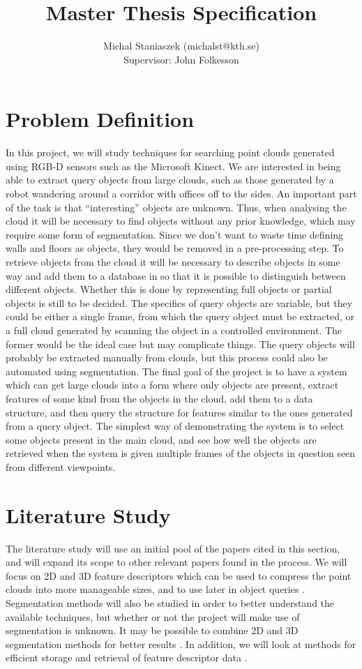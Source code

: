 \documentclass[10pt,a4paper]{article}
\author{Michal Staniaszek (michalst@kth.se)\\ Supervisor: John Folkesson}
\title{Master Thesis Specification}
\begin{document}
\maketitle
\section{Problem Definition}
In this project, we will study techniques for searching point clouds generated
using RGB-D sensors such as the Microsoft Kinect. We are interested in being
able to extract query objects from large clouds, such as those generated by a
robot wandering around a corridor with offices off to the sides. An important
part of the task is that ``interesting'' objects are unknown. Thus, when
analysing the cloud it will be necessary to find objects without any prior
knowledge, which may require some form of segmentation. Since we don't want to
waste time defining walls and floors as objects, they would be removed in a
pre-processing step. To retrieve objects from the cloud it will be necessary to
describe objects in some way and add them to a database in so that it is
possible to distinguish between different objects. Whether this is done by
representing full objects or partial objects is still to be decided. The
specifics of query objects are variable, but they could be either a single
frame, from which the query object must be extracted, or a full cloud generated
by scanning the object in a controlled environment. The former would be the
ideal case but may complicate things. The query objects will probably be
extracted manually from clouds, but this process could also be automated using
segmentation. The final goal of the project is to have a system which can get
large clouds into a form where only objects are present, extract features of
some kind from the objects in the cloud, add them to a data structure, and then
query the structure for features similar to the ones generated from a query
object. The simplest way of demonstrating the system is to select some objects
present in the main cloud, and see how well the objects are retrieved when the
system is given multiple frames of the objects in question seen from different
viewpoints.
\section{Literature Study}
The literature study will use an initial pool of the papers cited in this
section, and will expand its scope to other relevant papers found in the
process. We will focus on 2D and 3D feature descriptors which can be used to
compress the point clouds into more manageable sizes, and to use later in object
queries \cite{saenko2011practical, lai2011scalable, wohlkinger2011shape,
  mueller2013recognition, bo2011hierarchical}. Segmentation methods will also be
studied in order to better understand the available techniques, but whether or
not the project will make use of segmentation is unknown. It may be possible to
combine 2D and 3D segmentation methods for better results
\cite{haris1998watershed, woo2002new, rabbani2006segmentation}. In addition, we
will look at methods for efficient storage and retrieval of feature descriptor
data \cite{nister2006scalable, philbin2007object}.
\end{document}
